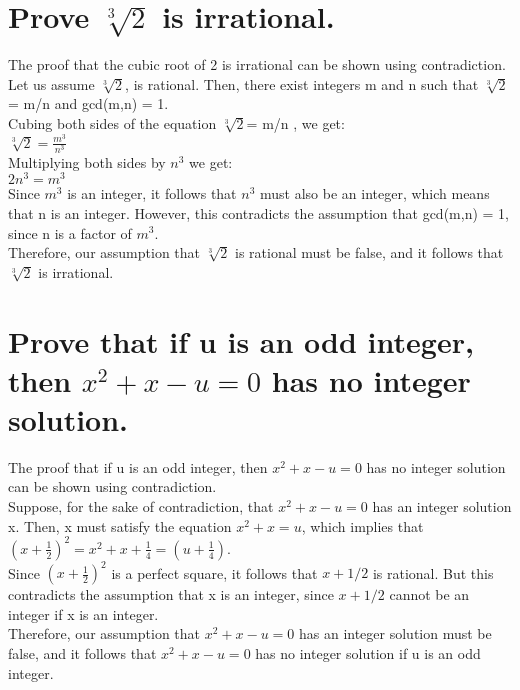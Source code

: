 \documentclass{article}
\begin{document}
\section{Prove $\sqrt[3]{2}$ is irrational.}
\Large The proof that the cubic root of 2 is irrational can be shown using contradiction.
Let us assume $\sqrt[3]{2}$, is rational. Then, there exist integers m and n such that $\sqrt[3]{2}$= m/n and gcd(m,n) = 1.\\
Cubing both sides of the equation $\sqrt[3]{2}$= m/n , we get:\\
$\sqrt[3]{2} = \frac{m^3}{n^3}$\\
Multiplying both sides by $n^3$ we get:\\
$2n^3 = m^3$\\
Since $m^3$ is an integer, it follows that $n^3$ must also be an integer, which means that n is an integer. However, this contradicts the assumption that gcd(m,n) = 1, since n is a factor of $m^3$.\\
Therefore, our assumption that $\sqrt[3]{2}$ is rational must be false, and it follows that $\sqrt[3]{2}$ is irrational.\\


\section{Prove that if u is an odd integer, then $x^2 +x − u = 0$ has no integer solution.}
\Large The proof that if u is an odd integer, then $x^2 +x − u = 0$ has no integer solution can be shown using contradiction.\\

\Large Suppose, for the sake of contradiction, that $x^2 +x − u = 0$ has an integer solution x. Then, x must satisfy the equation $x^2 + x = u$, which implies that $(x+ \frac{1}{2})^2 = x^2 + x + \frac{1}{4} = (u + \frac{1}{4})$.\\

\Large Since $(x + \frac{1}{2})^2$ is a perfect square, it follows that $x + 1/2$ is rational. But this contradicts the assumption that x is an integer, since $x + 1/2$ cannot be an integer if x is an integer.\\

\Large Therefore, our assumption that $x^2 +x − u = 0$ has an integer solution must be false, and it follows that  $x^2 +x − u = 0$ has no integer solution if u is an odd integer.\\
\end{document}
